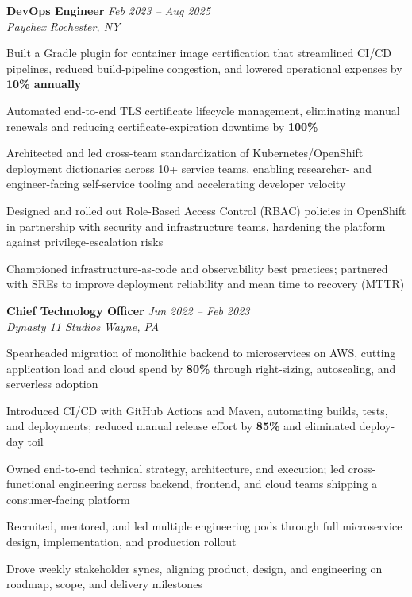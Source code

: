 \documentclass[letterpaper,10pt]{article}
\newcommand{\role}[4]{%
  \textbf{#1} \hfill \textit{#3}\\[-1pt]
  \textit{#2} \hfill \textit{#4}\par\vspace{2pt}
}
\begin{document}
\role{DevOps Engineer}{Paychex}{Feb 2023 -- Aug 2025}{Rochester, NY}
\begin{tightitemize}
  \item Built a Gradle plugin for container image certification that streamlined CI/CD pipelines, reduced build-pipeline congestion, and lowered operational expenses by \textbf{10\% annually}
  \item Automated end-to-end TLS certificate lifecycle management, eliminating manual renewals and reducing certificate-expiration downtime by \textbf{100\%}
  \item Architected and led cross-team standardization of Kubernetes/OpenShift deployment dictionaries across 10+ service teams, enabling researcher- and engineer-facing self-service tooling and accelerating developer velocity
  \item Designed and rolled out Role-Based Access Control (RBAC) policies in OpenShift in partnership with security and infrastructure teams, hardening the platform against privilege-escalation risks
  \item Championed infrastructure-as-code and observability best practices; partnered with SREs to improve deployment reliability and mean time to recovery (MTTR)
\end{tightitemize}

\role{Chief Technology Officer}{Dynasty 11 Studios}{Jun 2022 -- Feb 2023}{Wayne, PA}
\begin{tightitemize}
  \item Spearheaded migration of monolithic backend to microservices on AWS, cutting application load and cloud spend by \textbf{80\%} through right-sizing, autoscaling, and serverless adoption
  \item Introduced CI/CD with GitHub Actions and Maven, automating builds, tests, and deployments; reduced manual release effort by \textbf{85\%} and eliminated deploy-day toil
  \item Owned end-to-end technical strategy, architecture, and execution; led cross-functional engineering across backend, frontend, and cloud teams shipping a consumer-facing platform
  \item Recruited, mentored, and led multiple engineering pods through full microservice design, implementation, and production rollout
  \item Drove weekly stakeholder syncs, aligning product, design, and engineering on roadmap, scope, and delivery milestones
\end{tightitemize}
\end{document}
